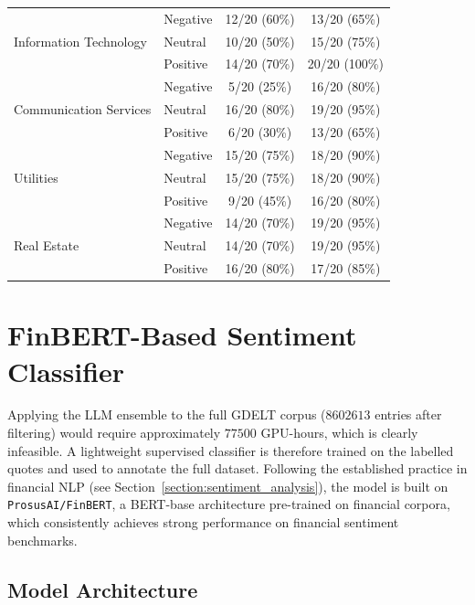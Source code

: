 \begin{table}[ht]
\begin{tabular}{|l|l|c|c|}
\multirow{3}{*}{Information Technology}
& Negative & 12/20 (60\%) & 13/20 (65\%) \\
& Neutral  & 10/20 (50\%) & 15/20 (75\%) \\
& Positive & 14/20 (70\%) & 20/20 (100\%) \\
\hline

\multirow{3}{*}{Communication Services}
& Negative & 5/20 (25\%) & 16/20 (80\%) \\
& Neutral  & 16/20 (80\%) & 19/20 (95\%) \\
& Positive & 6/20 (30\%) & 13/20 (65\%) \\
\hline

\multirow{3}{*}{Utilities}
& Negative & 15/20 (75\%) & 18/20 (90\%) \\
& Neutral  & 15/20 (75\%) & 18/20 (90\%) \\
& Positive & 9/20 (45\%) & 16/20 (80\%) \\
\hline

\multirow{3}{*}{Real Estate}
& Negative & 14/20 (70\%) & 19/20 (95\%) \\
& Neutral  & 14/20 (70\%) & 19/20 (95\%) \\
& Positive & 16/20 (80\%) & 17/20 (85\%) \\

\hline
\end{tabular}
\end{table}


\section{FinBERT-Based Sentiment Classifier}
\label{sec:finbert}

Applying the LLM ensemble to the full GDELT corpus ($\num{8602613}$ entries after filtering) would require approximately $\num{77500}$ GPU-hours, which is clearly infeasible. A lightweight supervised classifier is therefore trained on the labelled quotes and used to annotate the full dataset. Following the established practice in financial NLP (see Section~\ref{section:sentiment_analysis}), the model is built on \texttt{ProsusAI/FinBERT}, a BERT-base architecture pre-trained on financial corpora, which consistently achieves strong performance on financial sentiment benchmarks.

\subsection{Model Architecture}
\label{sec:architecture}

